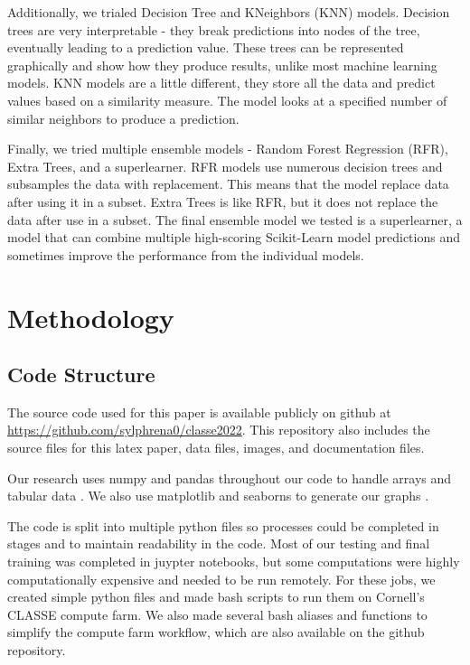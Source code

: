 \documentclass[twocolumn, nofootinbib, secnumarabic, amssymb, nobibnotes, aps, prd]{revtex4-2}
\begin{document}
Additionally, we trialed Decision Tree and KNeighbors (KNN) models. Decision trees are very interpretable - they break predictions into nodes of the tree, eventually leading to a prediction value. These trees can be represented graphically and show how they produce results, unlike most machine learning models. KNN models are a little different, they store all the data and predict values based on a similarity measure. The model looks at a specified number of similar neighbors to produce a prediction.

Finally, we tried multiple ensemble models - Random Forest Regression (RFR), Extra Trees, and a superlearner. RFR models use numerous decision trees and subsamples the data with replacement. This means that the model replace data after using it in a subset. Extra Trees is like RFR, but it does not replace the data after use in a subset. The final ensemble model we tested is a superlearner, a model that can combine multiple high-scoring Scikit-Learn model predictions and sometimes improve the performance from the individual models.


\section{Methodology}
\subsection{Code Structure} %
The source code used for this paper is available publicly on github at \url{https://github.com/sylphrena0/classe2022}. This repository also includes the source files for this latex paper, data files, images, and documentation files.

Our research uses numpy and pandas throughout our code to handle arrays and tabular data \cite{Harris2020array, Reback2020pandas}. We also use matplotlib and seaborns to generate our graphs \cite{Hunter2007, Waskom2021}.

The code is split into multiple python files so processes could be completed in stages and to maintain readability in the code. Most of our testing and final training was completed in juypter notebooks, but some computations were highly computationally expensive and needed to be run remotely. For these jobs, we created simple python files and made bash scripts to run them on Cornell's CLASSE compute farm. We also made several bash aliases and functions to simplify the compute farm workflow, which are also available on the github repository. 
\end{document}
